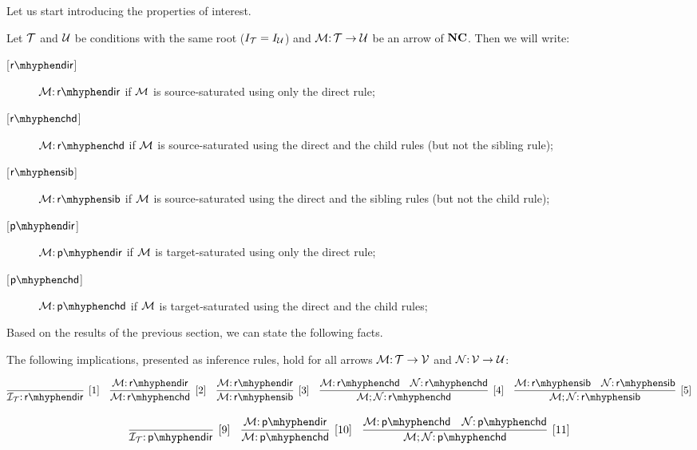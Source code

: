 Let us start introducing the properties of interest.

\begin{definition}
\label{def:properties}
\end{definition}
Let ${\mathcal{T}}$ and ${\mathcal{U}}$ be conditions with the same root ($I_{\mathcal{T}}=I_{\mathcal{U}}$) and ${\mathcal{M}} {:}\, {\mathcal{T}} \rightarrow {\mathcal{U}}$ be an arrow of $\mathbf{NC}$. Then we will write:

\begin{description}
    \item[{[$\rdir$]}] $\cM \of \rdir$ if ${\mathcal{M}}$ is source-saturated using only the  direct rule;
    \item [{[$\rchd$]}] $\cM \of \rchd$ if ${\mathcal{M}}$ is source-saturated using the  direct and the child rules (but not the sibling rule);
    \item  [{[$\rsib$]}] $\cM \of \rsib$ if ${\mathcal{M}}$ is source-saturated using the  direct and the sibling rules (but not the child rule);
    \item [{[$\pdir$]}] $\cM \of \pdir$ if ${\mathcal{M}}$ is target-saturated using only the  direct rule;
    \item [{[$\pchd$]}] $\cM \of \pchd$ if ${\mathcal{M}}$ is target-saturated using the  direct and the child rules;
\end{description}

Based on the results of the previous section, we can state the following facts.

\begin{proposition}
The following implications, presented as inference rules, hold for all arrows ${\mathcal{M}} {:}\,{\mathcal{T}} \rightarrow {\mathcal{V}}$ and ${\mathcal{N}}{:}\, {\mathcal{V}} \rightarrow {\mathcal{U}}$: 

$$\infer[{[1]}]{\cI_\cT \of \rdir}{} \quad \infer[{[2]}]{\cM\of \rchd}{\cM\of \rdir} \quad \infer[{[3]}]{\cM\of \rsib}{\cM\of \rdir} \quad \infer[{[4]}]{\cM;\cN\of \rchd}{\cM\of \rchd & \cN \of \rchd}  \quad \infer[{[5]}]{\cM;\cN\of \rsib}{\cM\of \rsib & \cN \of \rsib} $$


$$\infer[{[9]}]{\cI_\cT \of \pdir}{} \quad \infer[{[10]}]{\cM\of \pchd}{\cM\of \pdir} \quad 
\infer[{[11]}]{\cM;\cN\of \pchd}{\cM\of \pchd & \cN \of \pchd}  $$
\end{proposition} 


